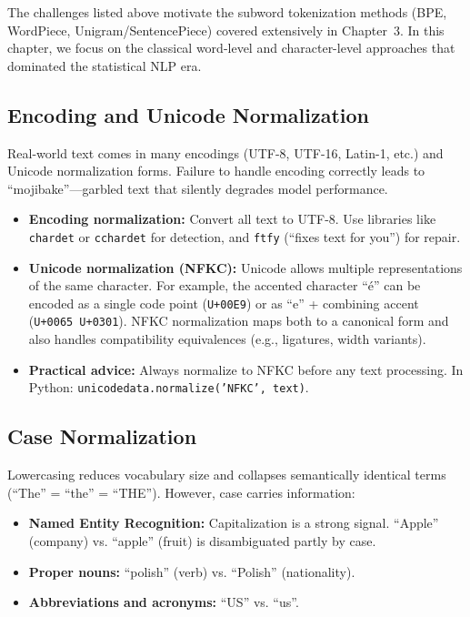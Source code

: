The challenges listed above motivate the subword tokenization methods (BPE, WordPiece,
Unigram/SentencePiece) covered extensively in Chapter~3. In this chapter, we focus on the
classical word-level and character-level approaches that dominated the statistical NLP era.

\subsection{Encoding and Unicode Normalization}
\label{sec:unicode}

Real-world text comes in many encodings (UTF-8, UTF-16, Latin-1, etc.) and Unicode
normalization forms. Failure to handle encoding correctly leads to ``mojibake''---garbled
text that silently degrades model performance.

\begin{itemize}
    \item \textbf{Encoding normalization:} Convert all text to UTF-8. Use libraries like
    \texttt{chardet} or \texttt{cchardet} for detection, and \texttt{ftfy} (``fixes text
    for you'') for repair.

    \item \textbf{Unicode normalization (NFKC):} Unicode allows multiple representations
    of the same character. For example, the accented character ``\'{e}'' can be encoded as
    a single code point (\texttt{U+00E9}) or as ``e'' + combining accent
    (\texttt{U+0065 U+0301}). NFKC normalization maps both to a canonical form and also
    handles compatibility equivalences (e.g., ligatures, width variants).

    \item \textbf{Practical advice:} Always normalize to NFKC before any text processing.
    In Python: \texttt{unicodedata.normalize('NFKC', text)}.
\end{itemize}

\subsection{Case Normalization}
\label{sec:case_normalization}

Lowercasing reduces vocabulary size and collapses semantically identical terms (``The'' =
``the'' = ``THE''). However, case carries information:

\begin{itemize}
    \item \textbf{Named Entity Recognition:} Capitalization is a strong signal.
    ``Apple'' (company) vs. ``apple'' (fruit) is disambiguated partly by case.
    \item \textbf{Proper nouns:} ``polish'' (verb) vs. ``Polish'' (nationality).
    \item \textbf{Abbreviations and acronyms:} ``US'' vs. ``us''.
\end{itemize}


